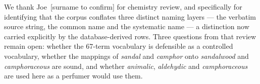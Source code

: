 \documentclass[
  computerscience
]{genesisl1-paper}
\begin{document}
We thank Joe~[surname to confirm] for chemistry review, and specifically for identifying that the
corpus conflates three distinct naming layers --- the verbatim source string, the common
name and the systematic name --- a distinction now carried explicitly by the
database-derived rows. Three questions from that review remain open: whether the 67-term
vocabulary is defensible as a controlled vocabulary, whether the mappings of \emph{sandal}
and \emph{camphor} onto \emph{sandalwood} and \emph{camphoraceous} are sound, and whether
\emph{animalic}, \emph{aldehydic} and \emph{camphoraceous} are used here as a perfumer
would use them.


\begingroup
\small
\setlength{\bibsep}{0pt plus 0.3ex}


\endgroup
\end{document}
